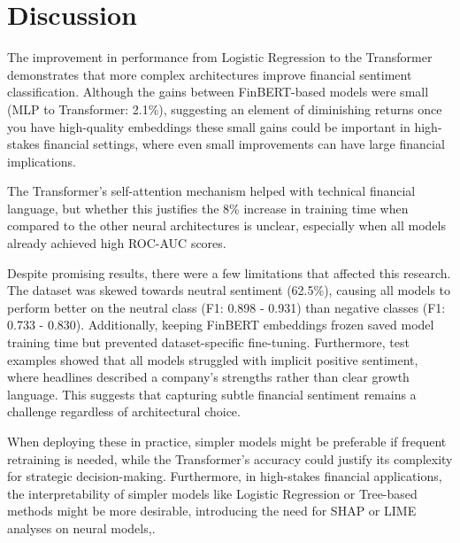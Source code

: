 \documentclass[english]{article}
\begin{document}
\vspace{-1em}

\section{Discussion}

\vspace{-0.5em}

The improvement in performance from Logistic Regression to the Transformer demonstrates that more
complex architectures improve financial sentiment classification. Although the gains between 
FinBERT-based models were small (MLP to Transformer: 2.1\%), suggesting an element of diminishing
returns once you have high-quality embeddings these small gains could be important in high-stakes financial settings, 
where even small improvements can have large financial implications.

The Transformer's self-attention mechanism\cite{Vaswani2017-dz}
helped with technical financial language, but whether this justifies the 8\% increase in training time
when compared to the other neural architectures is unclear, especially when all models already 
achieved high ROC-AUC scores.

Despite promising results, there were a few limitations that affected this research. The dataset
was skewed towards neutral sentiment (62.5\%), causing all models to perform better on the neutral 
class (F1: 0.898 - 0.931) than negative classes (F1: 0.733 - 0.830). Additionally, keeping FinBERT embeddings
frozen saved model training time but prevented dataset-specific fine-tuning. Furthermore, test 
examples showed that all models struggled with implicit positive sentiment, where headlines described
a company's strengths rather than clear growth language. This suggests that capturing subtle
financial sentiment remains a challenge regardless of architectural choice. 

When deploying these in practice, simpler models might be preferable if frequent retraining is needed, 
while the Transformer's accuracy could justify its complexity for strategic decision-making. Furthermore, 
in high-stakes financial applications, the interpretability of simpler models like Logistic Regression or Tree-based methods
might be more desirable, introducing the need for SHAP or LIME analyses on neural models\cite{LundbergScott2017AUAt},\cite{RibeiroMarcoTulio2016SIT}.
\end{document}
